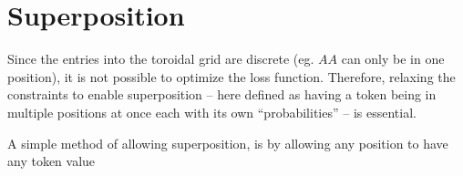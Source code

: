 
\section{Superposition}%
\label{sec:superposition}
Since the entries into the toroidal grid are discrete (eg. $AA$ can only be in one position), it is not possible to optimize the loss function. Therefore, relaxing the constraints to enable superposition -- here defined as having a token being in multiple positions at once each with its own ``probabilities'' -- is essential.

A simple method of allowing superposition, is by allowing any position to have any token value
